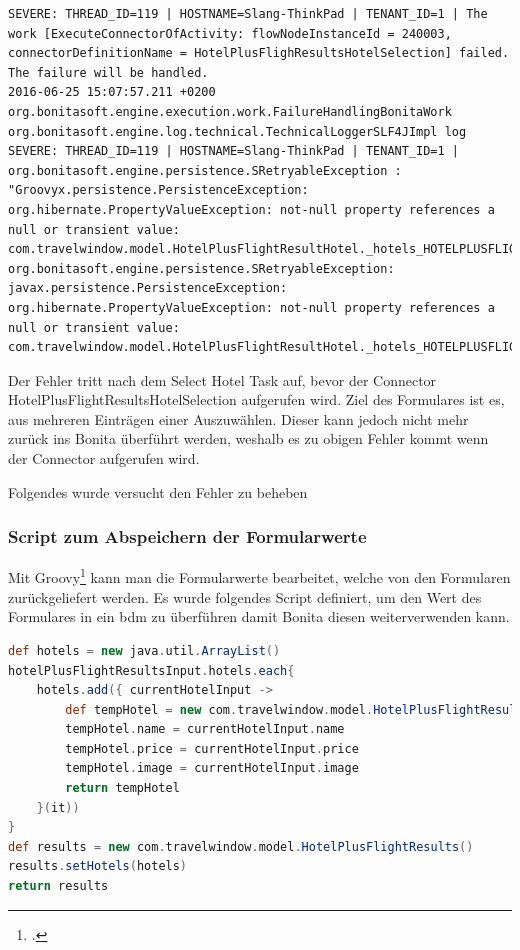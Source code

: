 \begin{lstlisting}[firstnumber=1]
SEVERE: THREAD_ID=119 | HOSTNAME=Slang-ThinkPad | TENANT_ID=1 | The work [ExecuteConnectorOfActivity: flowNodeInstanceId = 240003, connectorDefinitionName = HotelPlusFlighResultsHotelSelection] failed. The failure will be handled.
2016-06-25 15:07:57.211 +0200 org.bonitasoft.engine.execution.work.FailureHandlingBonitaWork org.bonitasoft.engine.log.technical.TechnicalLoggerSLF4JImpl log 
SEVERE: THREAD_ID=119 | HOSTNAME=Slang-ThinkPad | TENANT_ID=1 | org.bonitasoft.engine.persistence.SRetryableException : "Groovyx.persistence.PersistenceException: org.hibernate.PropertyValueException: not-null property references a null or transient value: com.travelwindow.model.HotelPlusFlightResultHotel._hotels_HOTELPLUSFLIGHTRESULTS_PIDBackref"
org.bonitasoft.engine.persistence.SRetryableException: javax.persistence.PersistenceException: org.hibernate.PropertyValueException: not-null property references a null or transient value: com.travelwindow.model.HotelPlusFlightResultHotel._hotels_HOTELPLUSFLIGHTRESULTS_PIDBackref
\end{lstlisting}

Der Fehler tritt nach dem Select Hotel Task auf, bevor der Connector HotelPlusFlightResultsHotelSelection aufgerufen wird. Ziel des Formulares ist es, aus mehreren Einträgen einer Auszuwählen. Dieser kann jedoch nicht mehr zurück ins Bonita überführt werden, weshalb es zu obigen Fehler kommt wenn der Connector aufgerufen wird.

Folgendes wurde versucht den Fehler zu beheben

\subsubsection{Script zum Abspeichern der Formularwerte}
Mit Groovy\footcite{Groovy_2016-06-25} kann man die Formularwerte bearbeitet, welche von den Formularen zurückgeliefert werden.
Es wurde folgendes Script definiert, um den Wert des Formulares in ein \gls{bdm} zu überführen damit Bonita diesen weiterverwenden kann.
\begin{lstlisting}[language=Groovy,firstnumber=1]
def hotels = new java.util.ArrayList()
hotelPlusFlightResultsInput.hotels.each{
	hotels.add({ currentHotelInput ->
		def tempHotel = new com.travelwindow.model.HotelPlusFlightResultHotel()
		tempHotel.name = currentHotelInput.name
		tempHotel.price = currentHotelInput.price
		tempHotel.image = currentHotelInput.image
		return tempHotel
	}(it))
}
def results = new com.travelwindow.model.HotelPlusFlightResults()
results.setHotels(hotels)
return results
\end{lstlisting}

